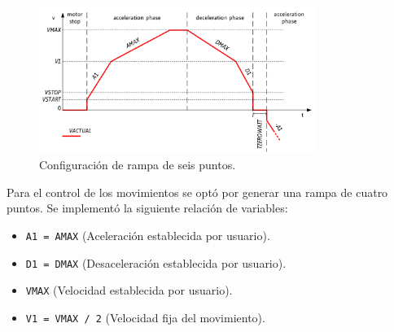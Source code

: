 \begin{figure}[h!]
	\centering
	\includegraphics[width=0.8\textwidth]{./Figures/rampa_1.png}
	\caption{Configuración de rampa de seis puntos.}
	\label{fig:rampa}
\end{figure}


%
%
%

Para el control de los movimientos se optó por generar una rampa de cuatro puntos. Se implementó la siguiente relación de variables:

\begin{itemize}
\item \texttt{A1 = AMAX}  (Aceleración establecida por usuario).
\item \texttt{D1 = DMAX}  (Desaceleración establecida por usuario).
\item \texttt{VMAX} 	  (Velocidad establecida por usuario).
\item \texttt{V1 = VMAX / 2} (Velocidad fija del movimiento).

\end{itemize}

